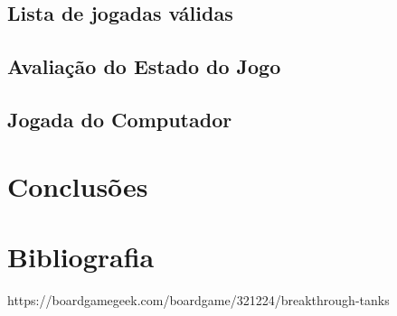 \documentclass[a4paper,11pt,portuguese]{article}
\begin{document}
    \subsection{Lista de jogadas válidas}



    \subsection{Avaliação do Estado do Jogo}



    \subsection{Jogada do Computador}



\section{Conclusões}



\section{Bibliografia}

https://boardgamegeek.com/boardgame/321224/breakthrough-tanks
\end{document}
